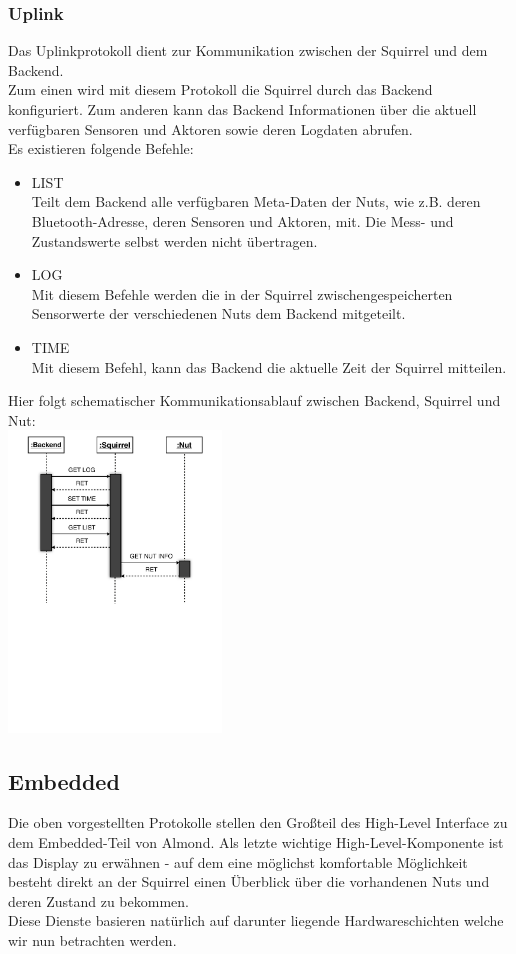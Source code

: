 \documentclass[12pt,a4paper]{article}
\begin{document}
	\subsubsection{Uplink}
Das Uplinkprotokoll dient zur Kommunikation zwischen der Squirrel und dem Backend.\\
Zum einen wird mit diesem Protokoll die Squirrel durch das Backend konfiguriert. Zum anderen kann das Backend Informationen über die aktuell verfügbaren Sensoren und Aktoren sowie deren Logdaten abrufen.\\
Es existieren folgende Befehle:
\begin{itemize}
	\item{LIST}\\
Teilt dem Backend alle verfügbaren Meta-Daten der Nuts, wie z.B. deren Bluetooth-Adresse, deren Sensoren und Aktoren, mit. Die Mess- und Zustandswerte selbst werden nicht übertragen.

	\item{LOG}\\
Mit diesem Befehle werden die in der Squirrel zwischengespeicherten Sensorwerte der verschiedenen Nuts dem Backend mitgeteilt.

	\item{TIME}\\
Mit diesem Befehl, kann das Backend die aktuelle Zeit der Squirrel mitteilen.

\end{itemize}
Hier folgt schematischer Kommunikationsablauf zwischen Backend, Squirrel und Nut:\\ 
\includegraphics[height=8cm]{./ProtokollSequence.pdf}\\
\subsection{Embedded}
Die oben vorgestellten Protokolle stellen den Großteil des High-Level Interface zu dem Embedded-Teil von Almond. Als letzte wichtige High-Level-Komponente ist das Display zu erwähnen - auf dem eine möglichst komfortable Möglichkeit besteht direkt an der Squirrel einen Überblick über die vorhandenen Nuts und deren Zustand zu bekommen.\\
Diese Dienste basieren natürlich auf darunter liegende Hardwareschichten welche wir nun betrachten werden.\\
\end{document}
